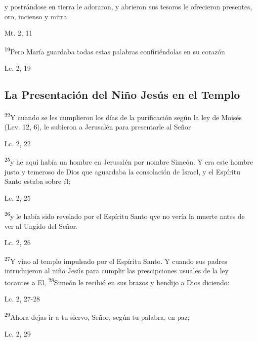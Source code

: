 \documentclass[a4paper,11pt]{article}
\begin{document}
      y postrándose en tierra le adoraron, y abrieron sus tesoros le ofrecieron presentes, oro, incienso y mirra.
      \begin{flushright}
        Mt. 2, 11         
      \end{flushright} 
      
      \textsuperscript{19}Pero María guardaba todas estas palabras confiriéndolas en su corazón
      \begin{flushright}
        Lc. 2, 19        
      \end{flushright}

    \subsection*{\hfil La Presentación del Niño Jesús en el Templo \hfil}
      
      \textsuperscript{22}Y cuando se les cumplieron los días de la purificación según la ley de Moisés (Lev. 12, 6), le subieron a Jerusalén para presentarle al Señor
      \begin{flushright}
        Lc. 2, 22         
      \end{flushright}
      
      \textsuperscript{25}y he aquí había un hombre en Jerusalén por nombre Simeón. Y era este hombre justo y temeroso de Dios que aguardaba la consolación de Israel, 
      y el Espíritu Santo estaba sobre él;
      \begin{flushright}
        Lc. 2, 25         
      \end{flushright}
      
      \textsuperscript{26}y le había sido revelado por el Espíritu Santo qye no vería la muerte antes de ver al Ungido del Señor.
      \begin{flushright}
        Lc. 2, 26       
      \end{flushright}
      
      \textsuperscript{27}Y vino al templo impulsado por el Espíritu Santo. Y cuando sus padres intrudujeron al niño Jesús para cumplir las prescipciones usuales
      de la ley tocantes a El, \textsuperscript{28}Simeón le recibió en sus brazos y bendijo a Dios diciendo:
      \begin{flushright}
        Lc. 2, 27-28         
      \end{flushright}
      
      \textsuperscript{29}Ahora dejas ir a tu siervo, Señor, según tu palabra, en paz;
      \begin{flushright}
        Lc. 2, 29        
      \end{flushright}
\end{document}
